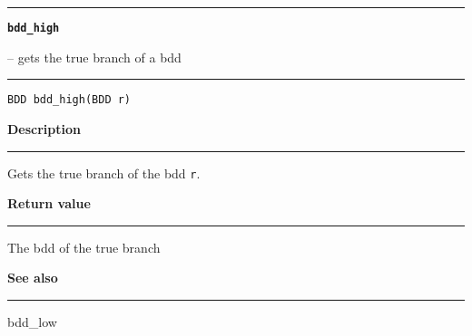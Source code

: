 \vspace{8ex}
\begin{minipage}{\textwidth}

\noindent\begin{minipage}{\textwidth}
\rule{\textwidth}{0.5mm}
{\tt\bf bdd\_high }
\--- gets the true branch of a bdd   \hspace{\fill}
\\\rule[1.5ex]{\textwidth}{0.5mm}
\end{minipage}

\noindent\begin{verbatim}
BDD bdd_high(BDD r) 
\end{verbatim}

\vspace{\parsep}\noindent
{\bf Description}\\\rule[1.5ex]{\textwidth}{0.2mm}\vspace{-1.5ex}\setlength{\parindent}{1em}
Gets the true branch of the bdd {\tt r}.  

\setlength{\parindent}{0em}\vspace{\parsep}\vspace{\baselineskip}\noindent
{\bf Return value}\\\rule[1.5ex]{\textwidth}{0.2mm}\vspace{-1.5ex}
The bdd of the true branch 

\vspace{\parsep}\vspace{\baselineskip}\noindent
{\bf See also}\\\rule[1.5ex]{\textwidth}{0.2mm}\vspace{-1.5ex}
bdd\_low 
\end{minipage}
\vspace{8ex}
